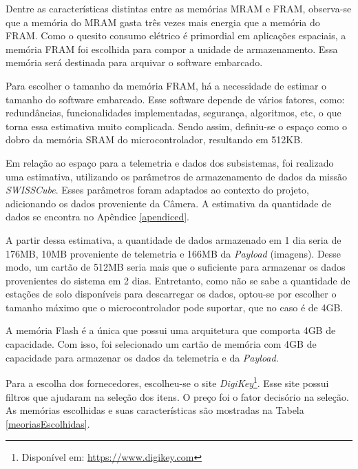 Dentre as características distintas entre as memórias MRAM e FRAM, observa-se que a memória do MRAM gasta três vezes mais energia que a memória do FRAM. Como o quesito consumo elétrico é primordial em aplicações espaciais, a memória FRAM foi escolhida para compor a unidade de armazenamento. Essa memória será destinada para arquivar o software embarcado.

Para escolher o tamanho da memória FRAM, há a necessidade de estimar o tamanho do software embarcado. Esse software depende de vários fatores, como: redundâncias, funcionalidades implementadas, segurança, algoritmos, etc, o que torna essa estimativa muito complicada. Sendo assim, definiu-se o espaço como o dobro da memória SRAM do microcontrolador,  resultando em 512KB.

Em relação ao espaço para a telemetria e dados dos subsistemas, foi realizado uma estimativa, utilizando os parâmetros de armazenamento de dados da missão \textit{SWISSCube}. Esses parâmetros foram adaptados ao contexto do projeto, adicionando os dados proveniente da Câmera. A estimativa da quantidade de dados se encontra no Apêndice \ref{apendiced}.

A partir dessa estimativa, a quantidade de dados armazenado em 1 dia seria de 176MB, 10MB proveniente de telemetria e 166MB da \textit{Payload} (imagens). Desse modo, um cartão de 512MB seria mais que o suficiente para armazenar os dados provenientes do sistema em 2 dias. Entretanto, como não se sabe a quantidade de estações de solo disponíveis para descarregar os dados, optou-se por escolher o tamanho máximo que o microcontrolador pode suportar, que no caso é de 4GB.

A memória Flash é a única que possui uma arquitetura que comporta 4GB de capacidade. Com isso, foi selecionado um cartão de memória com 4GB de capacidade para armazenar os dados da telemetria e da \textit{Payload}. 

Para a escolha dos fornecedores, escolheu-se o site \textit{DigiKey}\footnote{Disponível em: \url{https://www.digikey.com}}. Esse site possui filtros que ajudaram na seleção dos itens. O preço foi o fator decisório na seleção. As memórias escolhidas e suas características são mostradas na Tabela \ref{meoriasEscolhidas}.

\begin{table}[h]
	\centering
	\caption{Especificação das memórias da Unidade de Armazenamento.}
	\label{meoriasEscolhidas}
\end{table}

